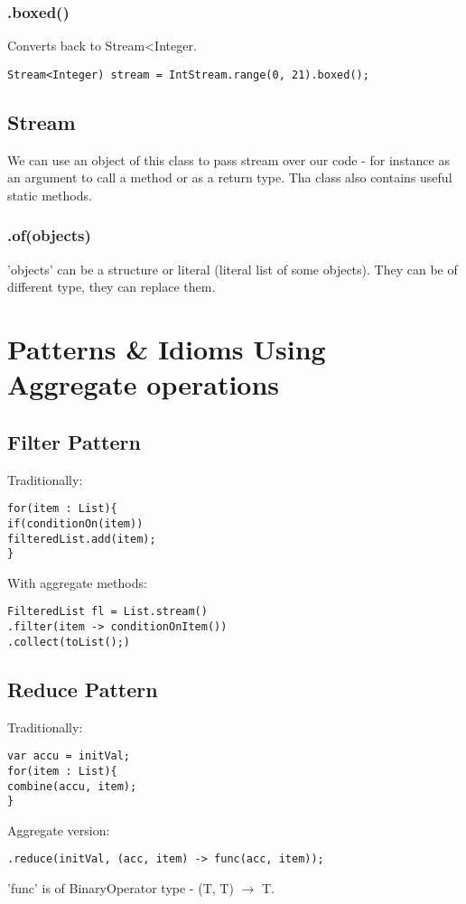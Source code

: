\documentclass{report}
\begin{document}
\subsection{.boxed()}
Converts back to Stream\textless Integer.
\begin{verbatim}
Stream<Integer) stream = IntStream.range(0, 21).boxed();
\end{verbatim}

\section{Stream}
We can use an object of this class to pass stream over our code - for instance as an argument to call a method or as a return type.
Tha class also contains useful static methods.

\subsection{.of(objects)}
'objects' can be a structure or literal (literal list of some objects). They can be of different type,
they can replace them.

\chapter{Patterns \& Idioms Using Aggregate operations}

\section*{Filter Pattern}
Traditionally:
\begin{verbatim}
for(item : List){
if(conditionOn(item))
filteredList.add(item);
}
\end{verbatim}
With aggregate methods:
\begin{verbatim}
FilteredList fl = List.stream()
.filter(item -> conditionOnItem())
.collect(toList();)
\end{verbatim}

\section*{Reduce Pattern}

Traditionally:
\begin{verbatim}
var accu = initVal;
for(item : List){
combine(accu, item);
}
\end{verbatim}

Aggregate version:
\begin{verbatim}
.reduce(initVal, (acc, item) -> func(acc, item));
\end{verbatim}
'func' is of BinaryOperator type - (T, T) $\rightarrow$ T.
\end{document}
